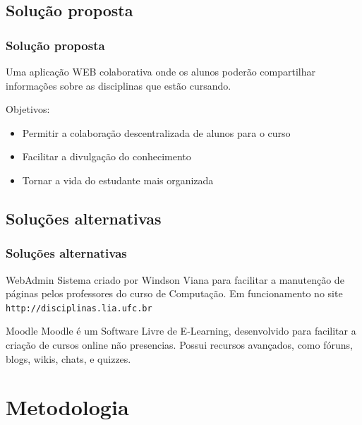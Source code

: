 \documentclass[11pt]{beamer}
\def\gap{\vspace{0.1in}}
\def\Gap{\vspace{0.25in}}
\begin{document}
	\subsection{Solução proposta}
	\begin{frame}
		\frametitle{Solução proposta}
		Uma aplicação \textsc{WEB} colaborativa onde os alunos poderão
		compartilhar informações sobre as disciplinas que estão cursando.

		\Gap
		Objetivos:
		\begin{itemize}
			\item Permitir a colaboração descentralizada de alunos para o curso
			\item Facilitar a divulgação do conhecimento
			\item Tornar a vida do estudante mais organizada
		\end{itemize}

	\end{frame}

	\subsection{Soluções alternativas}
	\begin{frame}
		\frametitle{Soluções alternativas}

		\begin{block}{WebAdmin}
			Sistema criado por Windson Viana para facilitar a manutenção de
			páginas pelos professores do curso de Computação. Em funcionamento
			no site \texttt{http://disciplinas.lia.ufc.br}
		\end{block}

		\gap
		\begin{block}{Moodle}
			Moodle é um Software Livre de E-Learning, desenvolvido para
			facilitar a criação de cursos online não presencias. Possui recursos
			avançados, como fóruns, blogs, wikis, chats, e quizzes.
		\end{block}
	\end{frame}

\section{Metodologia}
\end{document}
